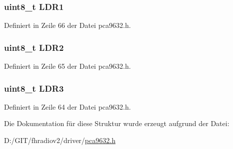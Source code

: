 \subsubsection[{L\+D\+R1}]{\setlength{\rightskip}{0pt plus 5cm}uint8\+\_\+t L\+D\+R1}\label{structpca9632__ledout_adf175f05578de85a5511e6fa73c7243d}


Definiert in Zeile 66 der Datei pca9632.\+h.

\hypertarget{structpca9632__ledout_af190ba57ddaccfb3782dc14637a0a893}{}
\subsubsection[{L\+D\+R2}]{\setlength{\rightskip}{0pt plus 5cm}uint8\+\_\+t L\+D\+R2}\label{structpca9632__ledout_af190ba57ddaccfb3782dc14637a0a893}


Definiert in Zeile 65 der Datei pca9632.\+h.

\hypertarget{structpca9632__ledout_ad197abe248f500fd016e0bb552d21fd3}{}
\subsubsection[{L\+D\+R3}]{\setlength{\rightskip}{0pt plus 5cm}uint8\+\_\+t L\+D\+R3}\label{structpca9632__ledout_ad197abe248f500fd016e0bb552d21fd3}


Definiert in Zeile 64 der Datei pca9632.\+h.



Die Dokumentation für diese Struktur wurde erzeugt aufgrund der Datei\+:\begin{DoxyCompactItemize}
\item 
D\+:/\+G\+I\+T/fhradiov2/driver/\hyperlink{pca9632_8h}{pca9632.\+h}\end{DoxyCompactItemize}

